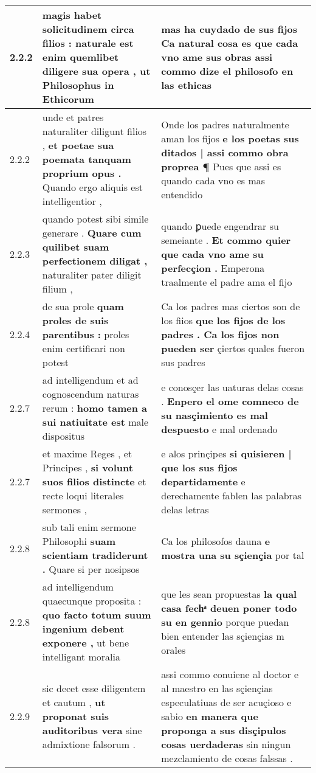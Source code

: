 \begin{tabular}{|p{1cm}|p{6.5cm}|p{6.5cm}|}
2.2.2 & magis habet solicitudinem circa filios : \textbf{ naturale est enim quemlibet diligere sua opera , } ut Philosophus in Ethicorum & mas ha cuydado de sus fijos \textbf{ Ca natural cosa es que cada vno ame sus obras } assi commo dize el philosofo en las ethicas \\\hline
2.2.2 & unde et patres naturaliter diligunt filios , \textbf{ et poetae sua poemata tanquam proprium opus . } Quando ergo aliquis est intelligentior , & Onde los padres naturalmente aman los fijos \textbf{ e los poetas sus ditados | assi commo obra proprea ¶ } Pues que assi es quando cada vno es mas entendido \\\hline
2.2.3 & quando potest sibi simile generare . \textbf{ Quare cum quilibet suam perfectionem diligat , } naturaliter pater diligit filium , & quando ꝑuede engendrar su semeiante . \textbf{ Et commo quier que cada vno ame su perfecçion . } Emperona traalmente el padre ama el fijo \\\hline
2.2.4 & de sua prole \textbf{ quam proles de suis parentibus : } proles enim certificari non potest & Ca los padres mas ciertos son de los fiios \textbf{ que los fijos de los padres . Ca los fijos non pueden ser } çiertos quales fueron sus padres \\\hline
2.2.7 & ad intelligendum et ad cognoscendum naturas rerum : \textbf{ homo tamen a sui natiuitate est } male dispositus & e conosçer las uaturas delas cosas . \textbf{ Enpero el ome comneco de su nasçimiento es mal despuesto } e mal ordenado \\\hline
2.2.7 & et maxime Reges , et Principes , \textbf{ si volunt suos filios distincte } et recte loqui literales sermones , & e alos prinçipes \textbf{ si quisieren | que los sus fijos departidamente } e derechamente fablen las palabras delas letras \\\hline
2.2.8 & sub tali enim sermone Philosophi \textbf{ suam scientiam tradiderunt . } Quare si per nosipsos & Ca los philosofos dauna \textbf{ e mostra una su sçiençia } por tal \\\hline
2.2.8 & ad intelligendum quaecunque proposita : \textbf{ quo facto totum suum ingenium debent exponere , } ut bene intelligant moralia & que les sean propuestas \textbf{ la qual casa fechͣ deuen poner todo su en gennio } porque puedan bien entender las sçiençias m orales \\\hline
2.2.9 & sic decet esse diligentem et cautum , \textbf{ ut proponat suis auditoribus vera } sine admixtione falsorum . & assi commo conuiene al doctor e al maestro en las sçiençias especulatiuas de ser acuçioso e sabio \textbf{ en manera que proponga a sus disçipulos cosas uerdaderas } sin ningun mezclamiento de cosas falssas . \\\hline

\end{tabular}
